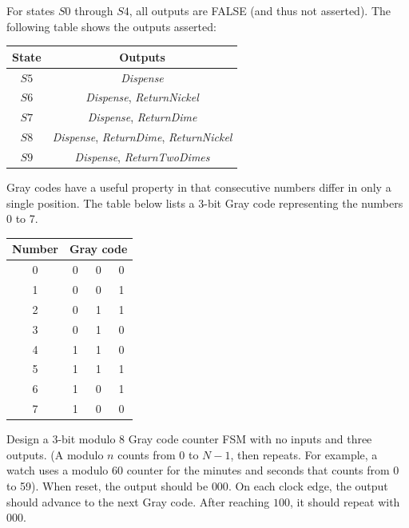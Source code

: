 \documentclass[12pt]{article}
\newenvironment{ex}[2][Exercise]{\begin{trivlist}
		\item[\hskip \labelsep {\bfseries #1}\hskip \labelsep {\bfseries #2.}]}{\end{trivlist}}
\newenvironment{sol}[1][Solution]{\begin{trivlist}
		\item[\hskip \labelsep {\bfseries #1:}]}{\end{trivlist}}
\begin{document}
\begin{sol}
\begin{center}
	\end{center}
	For states $S0$ through $S4$, all outputs are FALSE (and thus not asserted). The
	following table shows the outputs asserted:
	\begin{center}
		\begin{tabular}{cc}
			State & Outputs\\
			\hline
			$S5$ & \emph{Dispense}\\
			$S6$ & \emph{Dispense}, \emph{ReturnNickel}\\
			$S7$ & \emph{Dispense}, \emph{ReturnDime}\\
			$S8$ & \emph{Dispense}, \emph{ReturnDime}, \emph{ReturnNickel}\\
			$S9$ & \emph{Dispense}, \emph{ReturnTwoDimes}
		\end{tabular}
	\end{center}
\end{sol}

\begin{ex}{3.27}
	Gray codes have a useful property in that consecutive numbers differ in only a single
	position. The table below lists a 3-bit Gray code representing the numbers 0 to 7.
	
	\begin{center}
		\begin{tabular}{c|ccc}
			Number & \multicolumn{3}{c}{Gray code}\\
			\hline
			0 & 0 & 0 & 0\\
			1 & 0 & 0 & 1\\
			2 & 0 & 1 & 1\\
			3 & 0 & 1 & 0\\
			4 & 1 & 1 & 0\\
			5 & 1 & 1 & 1\\
			6 & 1 & 0 & 1\\
			7 & 1 & 0 & 0\\
		\end{tabular}
	\end{center}
	
	Design a 3-bit modulo 8 Gray code counter FSM with no inputs and three outputs.
	(A modulo $n$ counts from 0 to $N-1$, then repeats. For example, a watch uses a modulo
	60 counter for the minutes and seconds that counts from 0 to 59). When reset, the output should be $000$. On each clock edge, the output should advance to the next Gray code. After reaching
	$100$, it should repeat with $000$.
\end{ex}
\end{document}
